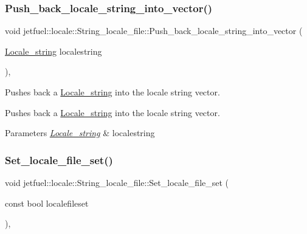 \subsubsection{\texorpdfstring{Push\+\_\+back\+\_\+locale\+\_\+string\+\_\+into\+\_\+vector()}{Push\_back\_locale\_string\_into\_vector()}}
{\footnotesize\ttfamily void jetfuel\+::locale\+::\+String\+\_\+locale\+\_\+file\+::\+Push\+\_\+back\+\_\+locale\+\_\+string\+\_\+into\+\_\+vector (\begin{DoxyParamCaption}\item[{\hyperlink{structjetfuel_1_1locale_1_1Locale__string}{Locale\+\_\+string}}]{localestring }\end{DoxyParamCaption})\hspace{0.3cm}{\ttfamily [inline]}, {\ttfamily [protected]}}



Pushes back a \hyperlink{structjetfuel_1_1locale_1_1Locale__string}{Locale\+\_\+string} into the locale string vector. 

Pushes back a \hyperlink{structjetfuel_1_1locale_1_1Locale__string}{Locale\+\_\+string} into the locale string vector.


\begin{DoxyParams}{Parameters}
{\em \hyperlink{structjetfuel_1_1locale_1_1Locale__string}{Locale\+\_\+string}} & localestring \\
\hline
\end{DoxyParams}
\mbox{\label{classjetfuel_1_1locale_1_1String__locale__file_a5ca20a4480bcd4b328d58c46fc2fae46}} 
\subsubsection{\texorpdfstring{Set\+\_\+locale\+\_\+file\+\_\+set()}{Set\_locale\_file\_set()}}
{\footnotesize\ttfamily void jetfuel\+::locale\+::\+String\+\_\+locale\+\_\+file\+::\+Set\+\_\+locale\+\_\+file\+\_\+set (\begin{DoxyParamCaption}\item[{const bool}]{localefileset }\end{DoxyParamCaption})\hspace{0.3cm}{\ttfamily [inline]}, {\ttfamily [protected]}}



